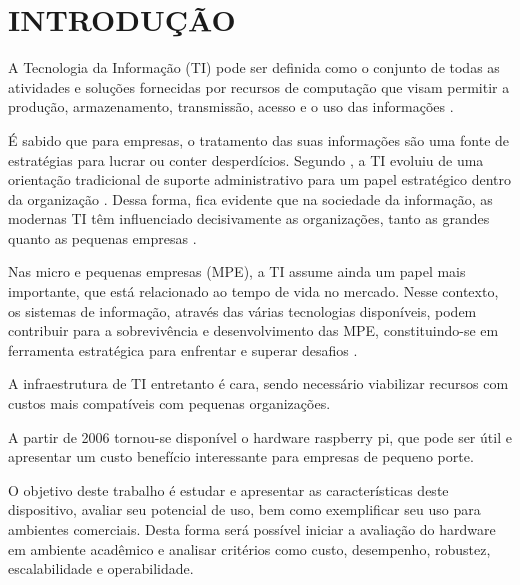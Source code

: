 \chapter{INTRODUÇÃO}

A Tecnologia da Informação (TI) pode ser definida como o conjunto de todas as atividades e soluções fornecidas por recursos de computação que visam permitir a produção, armazenamento, transmissão, acesso e o uso das informações \cite{WIKIPEDIA}.

É sabido que para empresas, o tratamento das suas informações são uma fonte de estratégias para lucrar ou conter desperdícios. Segundo , a TI evoluiu de uma orientação tradicional de suporte administrativo para um papel estratégico dentro da organização . Dessa forma, fica evidente que na sociedade da informação, as modernas TI têm influenciado decisivamente as organizações, tanto as grandes quanto as pequenas empresas \cite{CRISTINA}.

Nas micro e pequenas empresas (MPE), a TI assume ainda um papel mais importante, que está relacionado ao tempo de vida no mercado. Nesse contexto, os sistemas de informação, através das várias tecnologias disponíveis, podem contribuir para a sobrevivência e desenvolvimento das MPE, constituindo-se em ferramenta estratégica para enfrentar e superar desafios \cite{VALDIR}.

A infraestrutura de TI entretanto é cara, sendo necessário viabilizar recursos com custos mais compatíveis com pequenas organizações.

A partir de 2006 tornou-se disponível o hardware raspberry pi,  que pode ser útil e apresentar um custo benefício interessante para empresas de pequeno porte.

O objetivo deste trabalho é estudar e apresentar as características deste dispositivo, avaliar seu potencial de uso, bem como exemplificar seu uso para ambientes comerciais. Desta forma será possível iniciar a avaliação do hardware em ambiente acadêmico e analisar critérios como custo, desempenho, robustez, escalabilidade e operabilidade.




